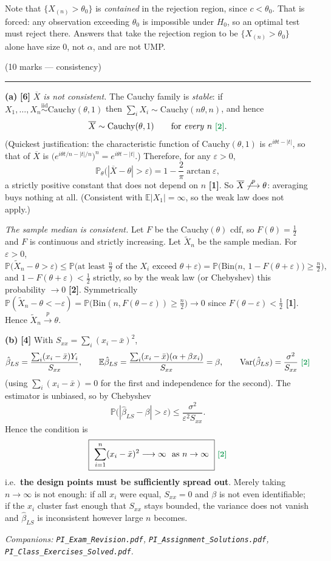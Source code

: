 \documentclass[11pt]{article}
\newcommand{\E}{\mathbb{E}}
\newcommand{\Var}{\operatorname{Var}}
\newcommand{\Prob}{\mathbb{P}}
\newcommand{\Xbar}{\overline{X}}
\newcommand{\iid}{\overset{\text{iid}}{\sim}}
\newcommand{\pto}{\overset{p}{\longrightarrow}}
\newcommand{\mk}[1]{{\small\color{ForestGreen}\textbf{[#1]}}}
\newcommand{\qhead}[2]{\bigskip\noindent{\large\bfseries Question #1}\quad\textnormal{\small(#2)}\par
  \vspace{2pt}\hrule\vspace{6pt}}
\begin{document}
\begin{trapbox}
Note that $\{X_{(n)}>\theta_0\}$ is \emph{contained} in the rejection region, since
$c<\theta_0$. That is forced: any observation exceeding $\theta_0$ is impossible under $H_0$,
so an optimal test must reject there. Answers that take the rejection region to be
$\{X_{(n)}>\theta_0\}$ alone have size $0$, not $\alpha$, and are not UMP.
\end{trapbox}

\qhead{9}{10 marks --- consistency}

\noindent\textbf{(a)} \mk{6}
\emph{$\Xbar$ is not consistent.} The Cauchy family is \emph{stable}: if
$X_1,\dots,X_n\iid\mathrm{Cauchy}(\theta,1)$ then $\sum_iX_i\sim\mathrm{Cauchy}(n\theta,n)$,
and hence
\[
\Xbar\sim\mathrm{Cauchy}(\theta,1)\qquad\text{for \emph{every} }n \ \mk{2}.
\]
(Quickest justification: the characteristic function of $\mathrm{Cauchy}(\theta,1)$ is
$e^{i\theta t-|t|}$, so that of $\Xbar$ is $\big(e^{i\theta t/n-|t|/n}\big)^{n}=e^{i\theta t-|t|}$.)
Therefore, for any $\varepsilon>0$,
\[
\Prob_\theta\big(|\Xbar-\theta|>\varepsilon\big)=1-\frac{2}{\pi}\arctan\varepsilon,
\]
a strictly positive constant that does not depend on $n$ \mk{1}. So $\Xbar\not\pto\theta$:
averaging buys nothing at all. (Consistent with $\E|X_1|=\infty$, so the weak law does not
apply.)

\emph{The sample median is consistent.} Let $F$ be the Cauchy$(\theta)$ cdf, so
$F(\theta)=\tfrac12$ and $F$ is continuous and strictly increasing. Let $\tilde X_n$ be the
sample median. For $\varepsilon>0$,
\[
\Prob\big(\tilde X_n-\theta>\varepsilon\big)
\le\Prob\big(\text{at least }\tfrac n2\text{ of the }X_i\text{ exceed }\theta+\varepsilon\big)
=\Prob\Big(\mathrm{Bin}\big(n,\,1-F(\theta+\varepsilon)\big)\ge\tfrac n2\Big),
\]
and $1-F(\theta+\varepsilon)<\tfrac12$ strictly, so by the weak law (or Chebyshev) this
probability $\to0$ \mk{2}. Symmetrically
$\Prob(\tilde X_n-\theta<-\varepsilon)=\Prob\big(\mathrm{Bin}(n,F(\theta-\varepsilon))\ge\tfrac n2\big)\to0$
since $F(\theta-\varepsilon)<\tfrac12$ \mk{1}. Hence $\tilde X_n\pto\theta$.

\smallskip\noindent\textbf{(b)} \mk{4}
With $S_{xx}=\sum_i(x_i-\bar x)^{2}$,
\[
\hat\beta_{LS}=\frac{\sum_i(x_i-\bar x)Y_i}{S_{xx}},\qquad
\E\hat\beta_{LS}=\frac{\sum_i(x_i-\bar x)(\alpha+\beta x_i)}{S_{xx}}=\beta,
\qquad
\Var(\hat\beta_{LS})=\frac{\sigma^{2}}{S_{xx}}\ \mk{2}
\]
(using $\sum_i(x_i-\bar x)=0$ for the first and independence for the second).
The estimator is unbiased, so by Chebyshev
\[
\Prob\big(|\hat\beta_{LS}-\beta|>\varepsilon\big)\le\frac{\sigma^{2}}{\varepsilon^{2}S_{xx}} .
\]
Hence the condition is
\[
\boxed{\ \sum_{i=1}^{n}(x_i-\bar x)^{2}\longrightarrow\infty\ \text{ as }n\to\infty\ }\ \mk{2}
\]
i.e.\ \textbf{the design points must be sufficiently spread out}. Merely taking $n\to\infty$
is not enough: if all $x_i$ were equal, $S_{xx}=0$ and $\beta$ is not even identifiable; if the
$x_i$ cluster fast enough that $S_{xx}$ stays bounded, the variance does not vanish and
$\hat\beta_{LS}$ is inconsistent however large $n$ becomes.

\vfill
\begin{center}
\small\itshape
Companions: \texttt{PI\_Exam\_Revision.pdf}, \texttt{PI\_Assignment\_Solutions.pdf},
\texttt{PI\_Class\_Exercises\_Solved.pdf}.
\end{center}
\end{document}
